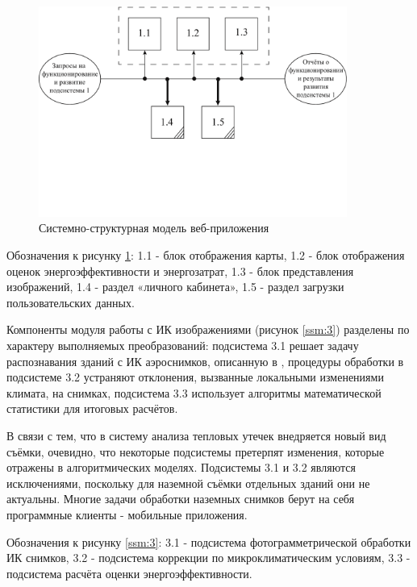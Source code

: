\pagebreak

	\begin{figure}[t!]
      \centering
      \includegraphics[width=0.9\textwidth]{images/ssm/1}
      \caption{Системно-структурная модель веб-приложения}
      \label{ssm:1}
    \end{figure}

\par
	Обозначения к рисунку \ref{ssm:1}: 1.1 - блок отображения карты, 1.2 - блок отображения оценок энергоэффективности и энергозатрат, 1.3 - блок представления изображений, 1.4 - раздел «личного кабинета», 1.5 - раздел загрузки пользовательских данных.

	Компоненты модуля работы с ИК изображениями (рисунок \ref{ssm:3}) разделены по характеру выполняемых преобразований: подсистема 3.1 решает задачу распознавания зданий с ИК аэроснимков, описанную в \cite{problem:heat}, процедуры обработки в подсистеме 3.2 устраняют отклонения, вызванные локальными изменениями климата, на снимках, подсистема 3.3 использует алгоритмы математической статистики для итоговых расчётов.

	В связи с тем, что в систему анализа тепловых утечек внедряется новый вид съёмки, очевидно, что некоторые подсистемы претерпят изменения, которые отражены в алгоритмических моделях. Подсистемы 3.1 и 3.2 являются исключениями, поскольку для наземной съёмки отдельных зданий они не актуальны. Многие задачи обработки наземных снимков берут на себя программные клиенты - мобильные приложения.

\pagebreak

	Обозначения к рисунку \ref{ssm:3}: 3.1 - подсистема фотограмметрической обработки ИК снимков, 3.2 - подсистема коррекции по микроклиматическим условиям, 3.3 - подсистема расчёта оценки энергоэффективности.

